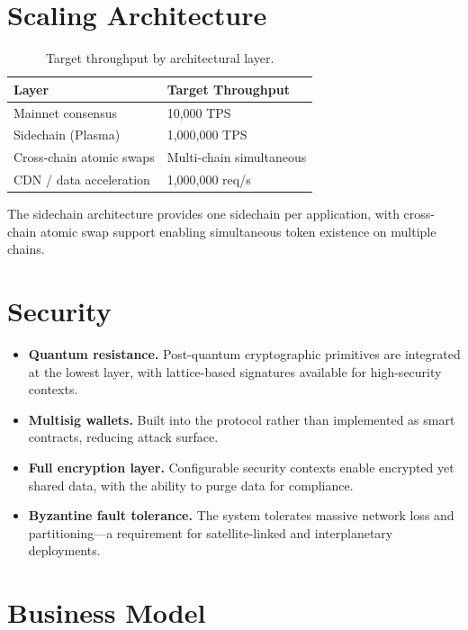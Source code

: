 \documentclass[11pt,twocolumn]{article}
\begin{document}
\section{Scaling Architecture}
\label{sec:scaling}

\begin{table}[H]
\centering
\small
\begin{tabular}{ll}
\toprule
\textbf{Layer} & \textbf{Target Throughput} \\
\midrule
Mainnet consensus & 10,000 TPS \\
Sidechain (Plasma) & 1,000,000 TPS \\
Cross-chain atomic swaps & Multi-chain simultaneous \\
CDN / data acceleration & 1,000,000 req/s \\
\bottomrule
\end{tabular}
\caption{Target throughput by architectural layer.}
\label{tab:throughput}
\end{table}

The sidechain architecture provides one sidechain per application, with
cross-chain atomic swap support enabling simultaneous token existence on
multiple chains.

\section{Security}
\label{sec:security}

\begin{itemize}[leftmargin=1.1em]
    \item \textbf{Quantum resistance.} Post-quantum cryptographic primitives are
    integrated at the lowest layer, with lattice-based signatures available for
    high-security contexts.
    \item \textbf{Multisig wallets.} Built into the protocol rather than
    implemented as smart contracts, reducing attack surface.
    \item \textbf{Full encryption layer.} Configurable security contexts enable
    encrypted yet shared data, with the ability to purge data for compliance.
    \item \textbf{Byzantine fault tolerance.} The system tolerates massive
    network loss and partitioning---a requirement for satellite-linked and
    interplanetary deployments.
\end{itemize}

\section{Business Model}
\label{sec:business}
\end{document}
